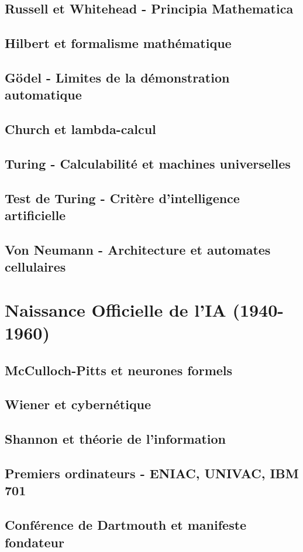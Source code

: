 \documentclass[12pt,a4paper]{book}
\begin{document}
\section{Russell et Whitehead - Principia Mathematica}
\section{Hilbert et formalisme mathématique}
\section{Gödel - Limites de la démonstration automatique}
\section{Church et lambda-calcul}
\section{Turing - Calculabilité et machines universelles}
\section{Test de Turing - Critère d'intelligence artificielle}
\section{Von Neumann - Architecture et automates cellulaires}

\chapter{Naissance Officielle de l'IA (1940-1960)}
\section{McCulloch-Pitts et neurones formels}
\section{Wiener et cybernétique}
\section{Shannon et théorie de l'information}
\section{Premiers ordinateurs - ENIAC, UNIVAC, IBM 701}
\section{Conférence de Dartmouth et manifeste fondateur}
\end{document}
